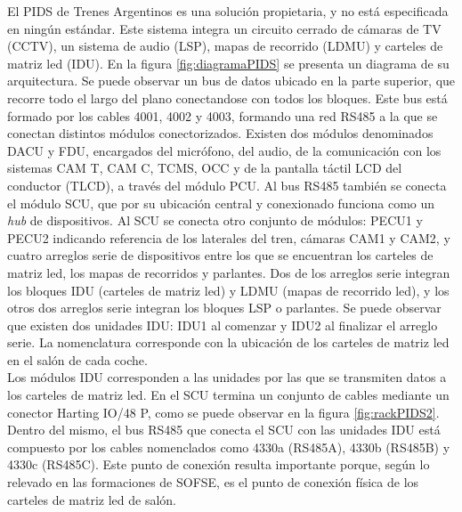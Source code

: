 El PIDS de Trenes Argentinos es una solución propietaria, y no está especificada en ningún estándar. Este sistema integra un circuito cerrado de cámaras de TV (CCTV), un sistema de audio (LSP), mapas de recorrido (LDMU) y carteles de matriz led (IDU). En la figura \ref{fig:diagramaPIDS} se presenta un diagrama de su arquitectura. Se puede observar un bus de datos ubicado en la parte superior, que recorre todo el largo del plano conectandose con todos los bloques. Este bus está formado por los cables 4001, 4002 y 4003, formando una red RS485 a la que se conectan distintos módulos conectorizados. Existen dos módulos denominados DACU y FDU, encargados del micrófono, del audio, de la comunicación con los sistemas CAM T, CAM C, TCMS, OCC y de la pantalla táctil LCD del conductor (TLCD), a través del módulo PCU. Al bus RS485 también se conecta el módulo SCU, que por su ubicación central y conexionado funciona como un \textit{hub} de dispositivos. Al SCU se conecta otro conjunto de módulos: PECU1 y PECU2 indicando referencia de los laterales del tren, cámaras CAM1 y CAM2, y cuatro arreglos serie de dispositivos entre los que se encuentran los carteles de matriz led, los mapas de recorridos y parlantes. Dos de los arreglos serie integran los bloques IDU (carteles de matriz led) y LDMU (mapas de recorrido led), y los otros dos arreglos serie integran los bloques LSP o parlantes. Se puede observar que existen dos unidades IDU: IDU1 al comenzar y IDU2 al finalizar el arreglo serie. La nomenclatura corresponde con la ubicación de los carteles de matriz led en el salón de cada coche. \\

Los módulos IDU corresponden a las unidades por las que se transmiten datos a los carteles de matriz led. En el SCU termina un conjunto de cables mediante un conector Harting IO/48 P, como se puede observar en la figura \ref{fig:rackPIDS2}. Dentro del mismo, el bus RS485 que conecta el SCU con las unidades IDU está compuesto por los cables nomenclados como 4330a (RS485A), 4330b (RS485B) y 4330c (RS485C). Este punto de conexión resulta importante porque, según lo relevado en las formaciones de SOFSE, es el punto de conexión física de los carteles de matriz led de salón.\\

